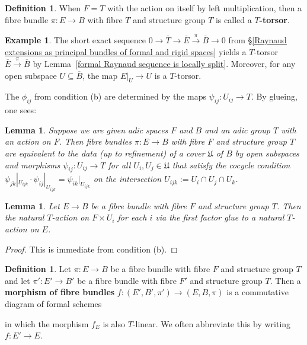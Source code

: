 \documentclass[10pt,oneside]{amsart}
\newtheorem{lemma}[theorem]{Lemma}
\theoremstyle{definition}
\newtheorem{definition}[theorem]{Definition}
\newtheorem{example}[theorem]{Example}
\begin{document}
	\begin{definition}
		When $F=T$ with the action on itself by left multiplication, then a fibre bundle $\pi\colon E\rightarrow B$ with fibre $T$ and structure group $T$ is called a \textbf{$T$-torsor}.
	\end{definition}
	
	\begin{example}
		The short exact sequence $0\rightarrow \overline{T}\rightarrow \overline{E}\xrightarrow{\pi} \overline{B}\rightarrow 0$ from \S\ref{Raynaud extensions as principal bundles of formal and rigid spaces} yields a $T$-torsor $\overline{E}\xrightarrow{\pi} \overline{B}$ by Lemma~\ref{formal Raynaud sequence is locally split}. Moreover, for any open subspace $U\subseteq \overline{B}$, the map $E|_U\rightarrow U$ is a $T$-torsor.
	\end{example}
	
	The $\phi_{ij}$ from condition (b) are determined by the maps $\psi_{ij}\colon U_{ij}\rightarrow T$. By glueing, one sees:
	\begin{lemma}\label{equivalent characterisation of principal $T$-bundle}
		Suppose we are given adic spaces $F$ and $B$ and an adic group $T$ with an action on $F$. Then fibre bundles $\pi\colon E\rightarrow B$ with fibre $F$ and structure group $T$ are equivalent to the data (up to refinement) of a cover $\mathfrak U$ of $B$ by open subspaces and morphisms $\psi_{ij}\colon U_{ij}\rightarrow T$ for all $U_i,U_j\in \mathfrak U$ that satisfy the cocycle condition $\psi_{jk}|_{U_{ijk}}\cdot \psi_{ij}|_{U_{ijk}}=\psi_{ik}|_{U_{ijk}}$ on the intersection $U_{ijk}:=U_i\cap U_j\cap U_k$.
	\end{lemma}
	\begin{lemma}
		Let $E\rightarrow B$ be a fibre bundle with fibre $F$ and structure group $T$. Then the natural $T$-action on $F\times U_{i}$ for each $i$ via the first factor glue to a natural $T$-action on $E$.
	\end{lemma}
	\begin{proof}
		This is immediate from condition (b).
	\end{proof}
	\begin{definition}
		Let $\pi\colon E\rightarrow B$ be a fibre bundle with fibre $F$ and structure group $T$ and let $\pi'\colon E'\rightarrow B'$ be a fibre bundle with fibre $F'$ and structure group $T$. Then a \textbf{morphism of fibre bundles} $f\colon (E',B',\pi')\rightarrow (E,B,\pi)$ is a commutative diagram of formal schemes
		\begin{center}
		\end{center}
		in which the morphism $f_E$ is also $T$-linear. We often abbreviate this by writing $f\colon E'\rightarrow E$.
	\end{definition}
\end{document}

